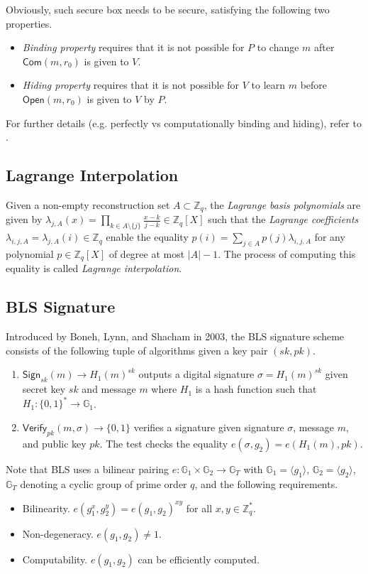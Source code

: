 \documentclass[letterpaper,twocolumn,10pt]{article}
\theoremstyle{definition}
\theoremstyle{remark}
\begin{document}
Obviously, such secure box needs to be secure, satisfying the following two properties.
\begin{itemize}
\item \textit{Binding property} requires that it is not possible for $P$ to change $m$ after $\mathsf{Com}(m, r_0)$ is given to $V$.
\item \textit{Hiding property} requires that it is not possible for $V$ to learn $m$ before $\mathsf{Open}(m, r_0)$ is given to $V$ by $P$.
\end{itemize}

For further details (e.g. perfectly vs computationally binding and hiding), refer to \cite{damgaard1998commitment}.

\subsection{Lagrange Interpolation}
\label{appendix:lagrange}
Given a non-empty reconstruction set $A \subset \mathbb{Z}_q$, the \textit{Lagrange basis polynomials} are given by $\lambda_{j, A}(x) = \prod_{k \in A \setminus \{j\}} \frac{x - k}{j - k} \in \mathbb{Z}_q[X]$ such that the \textit{Lagrange coefficients} $\lambda_{i, j, A} = \lambda_{j, A}(i) \in \mathbb{Z}_q$ enable the equality $p(i) = \sum_{j \in A} p(j) \lambda_{i, j, A}$ for any polynomial $p \in \mathbb{Z}_q[X]$ of degree at most $|A| - 1$. The process of computing this equality is called \textit{Lagrange interpolation}.

\subsection{BLS Signature}
\label{appendix:bls}
Introduced by Boneh, Lynn, and Shacham in 2003, the BLS signature scheme \cite{boneh2001short} consists of the following tuple of algorithms given a key pair $(sk, pk)$.
\begin{enumerate}
\item $\mathsf{Sign}_{sk}(m) \rightarrow H_1(m)^{sk}$ outputs a digital signature $\sigma = H_1(m)^{sk}$ given secret key $sk$ and message $m$ where $H_1$ is a hash function such that $H_1: \{0, 1\}^* \rightarrow \mathbb{G}_1$.
\item $\mathsf{Verify}_{pk}(m, \sigma) \rightarrow \{0, 1\}$ verifies a signature given signature $\sigma$, message $m$, and public key $pk$. The test checks the equality $e(\sigma, g_2) = e(H_1(m), pk)$.
\end{enumerate}
Note that BLS uses a bilinear pairing $e: \mathbb{G}_1 \times \mathbb{G}_2 \rightarrow \mathbb{G}_T$ with $\mathbb{G}_1 = \langle g_1 \rangle$, $\mathbb{G}_2 = \langle g_2 \rangle$, $\mathbb{G}_T$ denoting a cyclic group of prime order $q$, and the following requirements.
\begin{itemize}
\item Bilinearity. $e(g_1^x, g_2^y) = e(g_1, g_2)^{x y}$ for all $x, y \in \mathbb{Z}^*_q$.
\item Non-degeneracy. $e(g_1, g_2) \neq 1$.
\item Computability. $e(g_1, g_2)$ can be efficiently computed.
\end{itemize}
\end{document}
